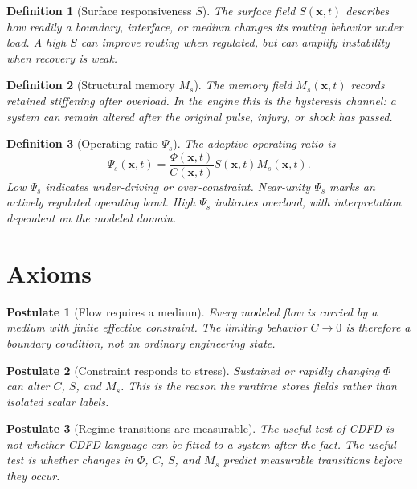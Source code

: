 \documentclass[12pt,a4paper]{article}
\newtheorem{postulate}{Postulate}
\newtheorem{definition}{Definition}
\begin{document}
\begin{definition}[Surface responsiveness $S$]
The surface field $S(\bm{x},t)$ describes how readily a boundary, interface, or
medium changes its routing behavior under load. A high $S$ can improve routing
when regulated, but can amplify instability when recovery is weak.
\end{definition}

\begin{definition}[Structural memory $M_s$]
The memory field $M_s(\bm{x},t)$ records retained stiffening after overload.
In the engine this is the hysteresis channel: a system can remain altered after
the original pulse, injury, or shock has passed.
\end{definition}

\begin{definition}[Operating ratio $\Psi_s$]
The adaptive operating ratio is
\begin{equation}
    \Psi_s(\bm{x},t)=\frac{\Phi(\bm{x},t)}{C(\bm{x},t)}S(\bm{x},t)M_s(\bm{x},t).
\end{equation}
Low $\Psi_s$ indicates under-driving or over-constraint. Near-unity $\Psi_s$
marks an actively regulated operating band. High $\Psi_s$ indicates overload,
with interpretation dependent on the modeled domain.
\end{definition}

\section{Axioms}
\begin{postulate}[Flow requires a medium]
Every modeled flow is carried by a medium with finite effective constraint.
The limiting behavior $C \to 0$ is therefore a boundary condition, not an
ordinary engineering state.
\end{postulate}

\begin{postulate}[Constraint responds to stress]
Sustained or rapidly changing $\Phi$ can alter $C$, $S$, and $M_s$. This is the
reason the runtime stores fields rather than isolated scalar labels.
\end{postulate}

\begin{postulate}[Regime transitions are measurable]
The useful test of CDFD is not whether CDFD language can be fitted to a system
after the fact. The useful test is whether changes in $\Phi$, $C$, $S$, and
$M_s$ predict measurable transitions before they occur.
\end{postulate}
\end{document}
